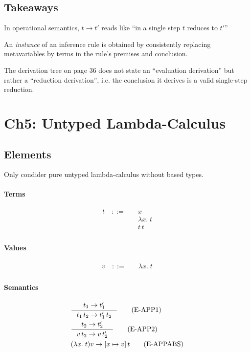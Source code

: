 \documentclass{article}
\newcommand{\lam}[2]{\lambda #1 .\;#2}
\newcommand{\app}[2]{#1\, #2}
\begin{document}
\subsection{Takeaways}
  In operational semantics, $t \to t'$ reads like ``in a single step $t$ reduces to $t'$''

  An \emph{instance} of an inference rule is obtained by consistently replacing
    metavariables by terms in the rule's premises and conclusion.

  The derivation tree on page 36 does not state an ``evaluation derivation'' but rather a ``reduction derivation'',
  i.e. the conclusion it derives is a valid single-step reduction.



\section{Ch5: Untyped Lambda-Calculus}
\subsection{Elements}
  \label{untyp}
  Only condider pure untyped lambda-calculus without based types.

\paragraph{Terms}
  \begin{align*}
    t \quad ::= \quad & x \tag{variable} \\
      & \lam{x}{t} \tag{abstraction} \\
      & \app{t}{t} \tag{application}\\
  \end{align*}

\paragraph{Values}
  \begin{align*}
    v \quad ::= \quad & \lam{x}{t} \tag{abstraction} \\
  \end{align*}

\paragraph{Semantics}
  \begin{align*}
    & \inference{t_1 \to t_1'}{\app{t_1}{t_2} \to \app{t_1'}{t_2}}  \tag{E-APP1} \\
    & \inference{t_2 \to t_2'}{\app{v}{t_2} \to \app{v}{t_2'}}  \tag{E-APP2} \\
    & (\lam{x}{t}) v \to [x\mapsto v]\, t \tag{E-APPABS} \\
  \end{align*}
\end{document}
